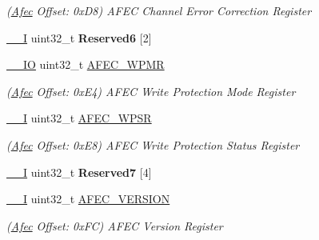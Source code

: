 \begin{DoxyCompactItemize}
\begin{DoxyCompactList}\small\item\em (\mbox{\hyperlink{structAfec}{Afec}} Offset\+: 0x\+D8) A\+F\+EC Channel Error Correction Register \end{DoxyCompactList}\item 
\mbox{\label{structAfec_a4760e3b8472acd4ec4994ec7f743ff63}} 
\mbox{\hyperlink{core__cm7_8h_af63697ed9952cc71e1225efe205f6cd3}{\+\_\+\+\_\+I}} uint32\+\_\+t {\bfseries Reserved6} \mbox{[}2\mbox{]}
\item 
\mbox{\label{structAfec_a86fecee02e4e45e21d694ebd7eb4811e}} 
\mbox{\hyperlink{core__cm7_8h_aec43007d9998a0a0e01faede4133d6be}{\+\_\+\+\_\+\+IO}} uint32\+\_\+t \mbox{\hyperlink{structAfec_a86fecee02e4e45e21d694ebd7eb4811e}{A\+F\+E\+C\+\_\+\+W\+P\+MR}}
\begin{DoxyCompactList}\small\item\em (\mbox{\hyperlink{structAfec}{Afec}} Offset\+: 0x\+E4) A\+F\+EC Write Protection Mode Register \end{DoxyCompactList}\item 
\mbox{\label{structAfec_ada320d843e1a82d21fc18942ec4f1623}} 
\mbox{\hyperlink{core__cm7_8h_af63697ed9952cc71e1225efe205f6cd3}{\+\_\+\+\_\+I}} uint32\+\_\+t \mbox{\hyperlink{structAfec_ada320d843e1a82d21fc18942ec4f1623}{A\+F\+E\+C\+\_\+\+W\+P\+SR}}
\begin{DoxyCompactList}\small\item\em (\mbox{\hyperlink{structAfec}{Afec}} Offset\+: 0x\+E8) A\+F\+EC Write Protection Status Register \end{DoxyCompactList}\item 
\mbox{\label{structAfec_a1db0f799a539d669b65886c0734a2fd7}} 
\mbox{\hyperlink{core__cm7_8h_af63697ed9952cc71e1225efe205f6cd3}{\+\_\+\+\_\+I}} uint32\+\_\+t {\bfseries Reserved7} \mbox{[}4\mbox{]}
\item 
\mbox{\label{structAfec_af978f50c15b343db6e4a813121e7c718}} 
\mbox{\hyperlink{core__cm7_8h_af63697ed9952cc71e1225efe205f6cd3}{\+\_\+\+\_\+I}} uint32\+\_\+t \mbox{\hyperlink{structAfec_af978f50c15b343db6e4a813121e7c718}{A\+F\+E\+C\+\_\+\+V\+E\+R\+S\+I\+ON}}
\begin{DoxyCompactList}\small\item\em (\mbox{\hyperlink{structAfec}{Afec}} Offset\+: 0x\+FC) A\+F\+EC Version Register \end{DoxyCompactList}\end{DoxyCompactItemize}


